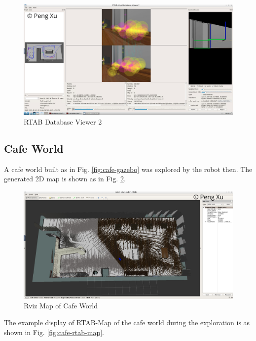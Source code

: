 \documentclass[10pt,journal,compsoc]{IEEEtran}
\begin{document}
\begin{figure}[thpb]
      \centering
      \includegraphics[width=\linewidth]{images/kitchen-database-viewer2.png}
      \caption{RTAB Database Viewer 2}
      \label{fig:kitchen-database-viewer2}
\end{figure}

\subsection{Cafe World}

A cafe world built as in Fig. \ref{fig:cafe-gazebo} was explored by the robot then. The generated 2D map is shown as in Fig. \ref{fig:cafe-rviz}.

\begin{figure}[thpb]
      \centering
      \includegraphics[width=\linewidth]{images/cafe-rviz.png}
      \caption{Rviz Map of Cafe World}
      \label{fig:cafe-rviz}
\end{figure}

The example display of RTAB-Map of the cafe world during the exploration is as shown in Fig. \ref{fig:cafe-rtab-map}.
\end{document}
